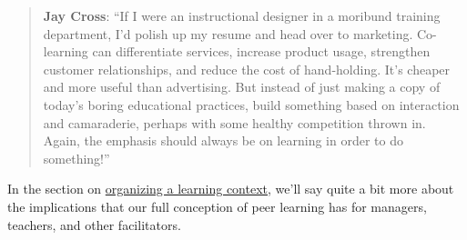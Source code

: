 \begin{quote}
\textbf{Jay Cross}: ``If I were an instructional designer in a moribund
training department, I'd polish up my resume and head over to marketing.
Co-learning can differentiate services, increase product usage,
strengthen customer relationships, and reduce the cost of hand-holding.
It's cheaper and more useful than advertising. But instead of just
making a copy of today's boring educational practices, build something
based on interaction and camaraderie, perhaps with some healthy
competition thrown in. Again, the emphasis should always be on learning
in order to do something!''
\end{quote}

In the section on \href{http://peeragogy.org/organize/}{organizing a
learning context}, we'll say quite a bit more about the implications
that our full conception of peer learning has for managers, teachers,
and other facilitators.
